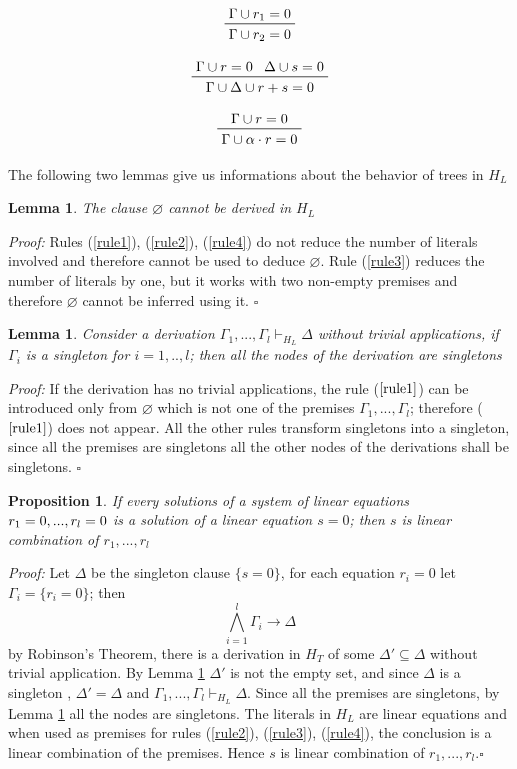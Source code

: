 \documentclass[a4paper,12pt,oneside]{book}
\newtheorem{proposition}[theorem]{Proposition}
\newtheorem{lemma}[theorem]{Lemma}
\newcommand*{\QED}{\hfill\ensuremath{\square}}
\let\emptyset\varnothing
\begin{document}
\begin{equation} \label{rule2}
\prftree{\Gamma\cup r_1=0 }{\Gamma\cup r_2=0 }
\end{equation}

\begin{equation} \label{rule3}
\prftree{\Gamma\cup r=0} {\Delta\cup s=0 }{\Gamma\cup\Delta\cup  r+s=0}
\end{equation}

\begin{equation} \label{rule4}
\prftree{\Gamma\cup r=0}{\Gamma\cup \alpha\cdot r=0 }
\end{equation}

\noindent The following two lemmas give us informations about the behavior of trees in $H_L$
\begin{lemma}\label{lemma_nempty}
The clause $\emptyset$ cannot be derived in $H_L$
\end{lemma}
\textit{Proof:} Rules (\ref{rule1}), (\ref{rule2}), (\ref{rule4}) do not reduce the number of literals involved and therefore cannot be used to deduce $\emptyset$. Rule (\ref{rule3}) reduces the number of literals by one, but it works with two non-empty premises and therefore $\emptyset$ cannot be inferred using it. \QED

\begin{lemma}\label{lemma_onlysingletons}
Consider a derivation $\Gamma_1,...,\Gamma_l \vdash_{H_L} \Delta $ without trivial applications, 
if $\Gamma_i$ is a singleton for $i=1,..,l$; then all the nodes of the derivation are singletons
\end{lemma}
\textit{Proof:} If the derivation has no trivial applications, the rule ($\ref{rule1}$) can be introduced only from $\emptyset$ which is not one of the premises $\Gamma_1,...,\Gamma_l$; therefore ($\ref{rule1}$)  does not appear. All the other rules transform singletons into a singleton, since all the premises are singletons all the other nodes of the derivations shall be singletons. \QED

\begin{proposition} 
If every solutions of a system of linear equations $r_1=0,...,r_l=\nobreak 0$  is a solution of a linear equation $s=0$; then $s$ is linear combination of $r_1,...,r_l$
\end{proposition}

\textit{Proof:} Let $\Delta$ be the singleton clause $\{s=0\}$, for each equation $r_i=0$  let $\Gamma_i=\{r_i=0\}$; then 
$$ \bigwedge_{i=1}^l \Gamma_i \rightarrow \Delta $$
by Robinson's Theorem, there is a derivation in $H_T$ of some $\Delta' \subseteq\Delta$ without trivial application. By Lemma \ref{lemma_nempty} $\Delta'$ is not the empty set,  and  since $\Delta$ is a singleton , $\Delta'=\Delta$ and $ \Gamma_1,...,\Gamma_l \vdash_{H_L} \Delta  $.
Since all the premises are singletons, by Lemma \ref{lemma_onlysingletons} all the nodes are singletons. The literals in $H_L$ are linear equations and when used as premises for rules (\ref{rule2}), (\ref{rule3}), (\ref{rule4}), the conclusion is a linear combination of the premises. 
Hence $s$ is linear combination of $r_1,...,r_l$.\QED
\end{document}
